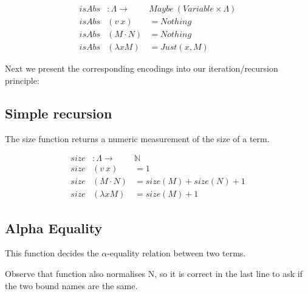 \documentclass{entcs}
\newcommand{\alp}{\ensuremath{\alpha}}
\begin{document}
\begin{minipage}{.9\textwidth}
\[
\begin{array}{rll}
isAbs &: \Lambda \rightarrow& Maybe\ (Variable \times \Lambda) \\
isAbs &(v\ x)         &= Nothing \\
isAbs &(M \cdot N)   &= Nothing \\
isAbs &(\lambda x M) &= Just (x , M)
\end{array} \]
\end{minipage}

Next we present the corresponding encodings into our iteration/recursion principle:

  
 \hspace{5px}

\subsection{Simple recursion}
\label{sec:rec}

The size function returns a numeric measurement of the size of a term.


\begin{minipage}{.9\textwidth}
\[
\begin{array}{rll}
size &: \Lambda \rightarrow& \mathbb{N} \\
size &(v\ x)         &= 1 \\
size &(M \cdot N)   &= size (M) + size (N) + 1 \\
size &(\lambda x M) &= size (M) + 1 
\end{array} \]
\end{minipage}

 \hspace{5px}

\subsection{Alpha Equality}

This function decides the \alp-equality relation between two terms.

 \hspace{5px}

Observe that  function also normalises N, so it is correct in the last line to ask if the two bound names are the same.
\end{document}
